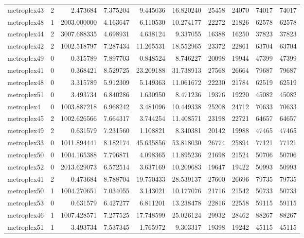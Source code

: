 \begin{longtable}{|l|r|r|r|r|r|r|r|r|r|}
metroplex43 & 2 & 2.473684 & 7.375204 & 9.445036 & 16.820240 & 25458 & 24070 & 74017 & 74017 \\
metroplex48 & 1 & 2003.000000 & 4.163647 & 6.110530 & 10.274177 & 22272 & 21826 & 62578 & 62578 \\
metroplex44 & 2 & 3007.688335 & 4.698931 & 4.638124 & 9.337055 & 16388 & 16250 & 37823 & 37823 \\
metroplex42 & 2 & 1002.518797 & 7.287434 & 11.265531 & 18.552965 & 23372 & 22861 & 63704 & 63704 \\
metroplex49 & 0 & 0.315789 & 7.897703 & 0.848524 & 8.746227 & 20098 & 19944 & 47399 & 47399 \\
metroplex41 & 0 & 0.368421 & 8.529725 & 23.209188 & 31.738913 & 27568 & 26664 & 79687 & 79687 \\
metroplex48 & 0 & 3.315789 & 5.912309 & 5.149363 & 11.061672 & 22230 & 21784 & 62519 & 62519 \\
metroplex51 & 0 & 3.493734 & 6.840286 & 1.630950 & 8.471236 & 19376 & 19220 & 45082 & 45082 \\
metroplex4 & 0 & 1003.887218 & 6.968242 & 3.481096 & 10.449338 & 25208 & 24712 & 70633 & 70633 \\
metroplex45 & 2 & 1002.626566 & 7.664317 & 3.744254 & 11.408571 & 23198 & 22721 & 64657 & 64657 \\
metroplex49 & 2 & 0.631579 & 7.231560 & 1.108821 & 8.340381 & 20142 & 19988 & 47465 & 47465 \\
metroplex33 & 0 & 1011.894441 & 8.182174 & 45.635856 & 53.818030 & 26774 & 25894 & 77121 & 77121 \\
metroplex50 & 0 & 1004.165388 & 7.796871 & 4.098365 & 11.895236 & 21698 & 21524 & 50706 & 50706 \\
metroplex52 & 0 & 2013.629073 & 6.572514 & 3.637169 & 10.209683 & 19647 & 19422 & 50993 & 50993 \\
metroplex41 & 2 & 0.473684 & 8.788704 & 19.750433 & 28.539137 & 27600 & 26696 & 79735 & 79735 \\
metroplex50 & 1 & 1004.270651 & 7.034055 & 3.143021 & 10.177076 & 21716 & 21542 & 50733 & 50733 \\
metroplex53 & 0 & 0.631579 & 6.427277 & 6.811201 & 13.238478 & 22816 & 22558 & 59115 & 59115 \\
metroplex46 & 1 & 1007.428571 & 7.277525 & 17.748599 & 25.026124 & 29932 & 28462 & 88267 & 88267 \\
metroplex51 & 1 & 3.493734 & 7.537345 & 1.765972 & 9.303317 & 19398 & 19242 & 45115 & 45115 \\

\end{longtable}

